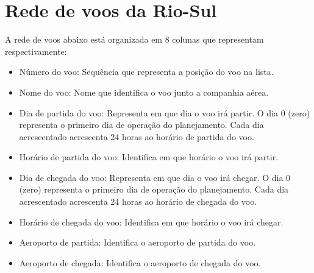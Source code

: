 \chapter{Rede de voos da Rio-Sul}\label{anx:netriosul}

A rede de voos abaixo está organizada em 8 colunas que representam
respectivamente:

\begin{itemize}
  \item Número do voo: Sequência que representa a posição do voo na lista.
  \item Nome do voo: Nome que identifica o voo junto a companhia aérea.
  \item Dia de partida do voo: Representa em que dia o voo irá partir. O dia
  0 (zero) representa o primeiro dia de operação do planejamento. Cada dia
  acrescentado acrescenta 24 horas ao horário de partida do voo.
  \item Horário de partida do voo: Identifica em que horário o voo irá partir.
  \item Dia de chegada do voo: Representa em que dia o voo irá chegar. O dia
  0 (zero) representa o primeiro dia de operação do planejamento. Cada dia
  acrescentado acrescenta 24 horas ao horário de chegada do voo.
  \item Horário de chegada do voo: Identifica em que horário o voo irá chegar.
  \item Aeroporto de partida: Identifica o aeroporto de partida do voo.
  \item Aeroporto de chegada: Identifica o aeroporto de chegada do voo.
    
\end{itemize}


